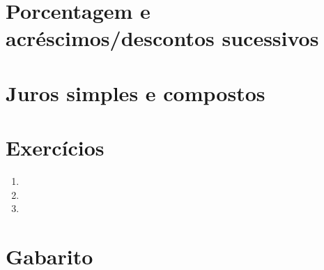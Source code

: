 \documentclass[11pt,a4paper]{article}
\begin{document}
\section{Porcentagem e acréscimos/descontos sucessivos}

\section{Juros simples e compostos}


\section{Exercícios}
\begin{enumerate}[label=\textbf{\arabic*.}]
  \item %
  \item %
  \item %
\end{enumerate}

\begin{desafio}
\end{desafio}

\section*{Gabarito}
\end{document}

